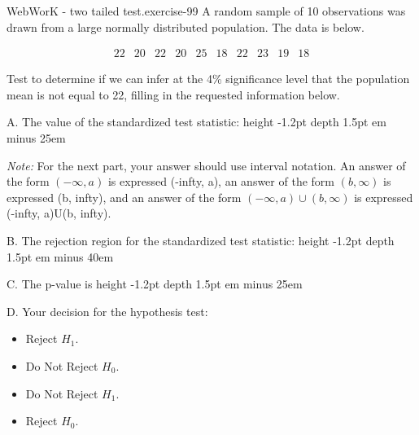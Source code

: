 \documentclass[10pt,]{book}
\newcommand{\fillin}[1]{\leavevmode\leaders\vrule height -1.2pt depth 1.5pt \hskip #1em minus #1em \null}
\numberwithin{equation}{section}
\newcommand{\amp}{&}
\begin{document}
\begin{inlineexercise}{WebWorK - two tailed test.}{exercise-99}%
\hypertarget{p-1400}{}%
A random sample of 10 observations was drawn from a large normally distributed population.  The data is below.%
\par
\hypertarget{p-1401}{}%
%
\begin{equation*}
\begin{array}{ccccccccccc} 
22 \amp  20 \amp  22 \amp  20 \amp  25 \amp  18 \amp  22 \amp  23 \amp  19 \amp  18 
\end{array}
\end{equation*}
%
\par
\hypertarget{p-1402}{}%
Test to determine if we can infer at the 4\% significance level that the population mean is not equal to 22, filling in the requested information below.%
\par
\hypertarget{p-1403}{}%
A. The value of the standardized test statistic:  \fillin{25}%
\par
\hypertarget{p-1404}{}%
\emph{Note:} For the next part, your answer should use interval notation.  An answer of the form \((-\infty, a)\) is expressed (-infty, a), an answer of the form \((b, \infty)\) is expressed (b, infty), and an answer of the form \((-\infty, a) \cup (b, \infty)\) is expressed (-infty, a)U(b, infty).%
\par
\hypertarget{p-1405}{}%
B. The rejection region for the standardized test statistic:  \fillin{40}%
\par
\hypertarget{p-1406}{}%
C. The p-value is  \fillin{25}%
\par
\hypertarget{p-1407}{}%
D. Your decision for the hypothesis test:%
\par
\hypertarget{p-1408}{}%
\par
\begin{itemize}[label=$\odot$,leftmargin=3em,]
\item{}\hypertarget{p-1409}{}%
Reject \(H_1\).%

\item{}\hypertarget{p-1410}{}%
Do Not Reject \(H_0\).%

\item{}\hypertarget{p-1411}{}%
Do Not Reject \(H_1\).%

\item{}\hypertarget{p-1412}{}%
Reject \(H_0\).%

\end{itemize}
%
\end{inlineexercise}
%
\par
\end{document}
